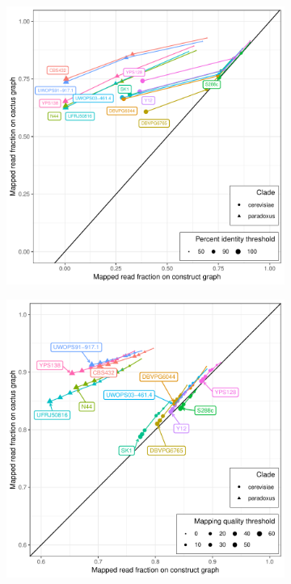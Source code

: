 \documentclass{article}
\begin{document}
\clearpage
\begin{figure}
  \begin{subfigure}[b]{.5\textwidth}
    \caption{}
    \includegraphics[width=\textwidth]{pdf/yeast-mapping-identity-all.pdf}
  \end{subfigure}
  \begin{subfigure}[b]{.5\textwidth}
    \caption{}
    \includegraphics[width=\textwidth]{pdf/yeast-mapping-quality-all.pdf}
  \end{subfigure}
\end{figure}
\end{document}

